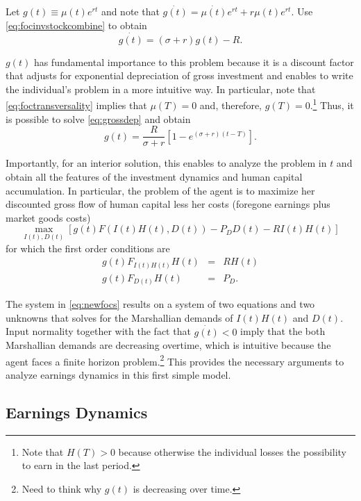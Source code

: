 \noindent Let $g(t) \equiv \mu(t) e^{rt}$ and note that $\dot{g(t)} = \dot{\mu(t)} e^{rt} + r \mu(t) e ^{rt}$. Use \eqref{eq:focinvstockcombine} to obtain 
\begin{equation}
\dot{g(t)} = (\sigma + r ) g(t) - R \label{eq:grossdep}.
\end{equation}

\indent $g(t)$ has fundamental importance to this problem because it is a discount factor that adjusts for exponential depreciation of gross investment and enables to write the individual's problem in a more intuitive way. In particular, note that \eqref{eq:foctransversality} implies that $\mu(T) = 0 $ and, therefore, $g(T) = 0$.\footnote{Note that $H(T) > 0$ because otherwise the individual losses the possibility to earn in the last period.} Thus, it is possible to solve \eqref{eq:grossdep} and obtain
\begin{equation}
g(t) = \frac{R}{\sigma + r} \left[ 1 - e^{(\sigma + r)(t - T)} \right].
\end{equation}

\indent Importantly, for an interior solution, this enables to analyze the problem in $t$ and obtain all the features of the investment dynamics and human capital accumulation. In particular, the problem of the agent is to maximize her discounted gross flow of human capital less her costs (foregone earnings plus market goods costs) 
\begin{equation}
\max_{I(t), D(t)} \left[ g(t) F(I(t) H(t), D(t)) - P_{D} D(t) - R I (t) H(t) \right]
\end{equation}
for which the first order conditions are
\begin{eqnarray}
g(t) F_{I(t)H(t)} H(t) &=& R H (t) \nonumber \\
g(t) F_{D(t)} H(t) &=& P_{D} \label{eq:newfocs}. 
\end{eqnarray}

The system in \eqref{eq:newfocs} results on a system of two equations and two unknowns that solves for the Marshallian demands of $I(t)H(t)$ and $D(t)$. Input normality together with the fact that $\dot{g(t)} < 0$ imply that the both Marshallian demands are decreasing overtime, which is intuitive because the agent faces a finite horizon problem.\footnote{Need to think why $g(t)$ is decreasing over time.} This provides the necessary arguments to analyze earnings dynamics in this first simple model.
\subsection{Earnings Dynamics}
